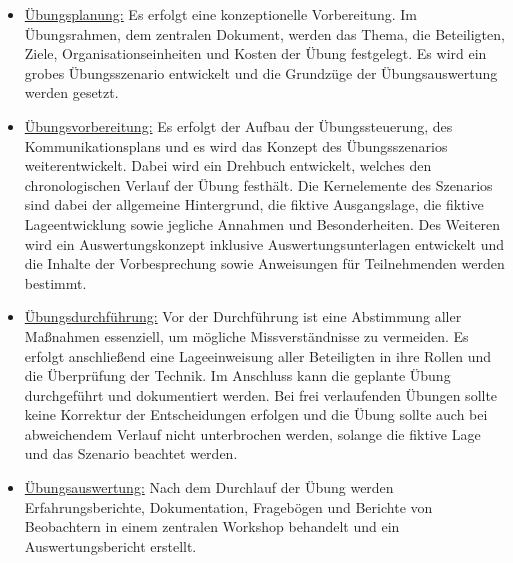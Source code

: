 \begin{itemize}
    \item \underline{Übungsplanung:}
    Es erfolgt eine konzeptionelle Vorbereitung. Im Übungsrahmen, dem zentralen Dokument, werden das Thema, die Beteiligten, Ziele, Organisationseinheiten und Kosten der Übung festgelegt. Es wird ein grobes Übungsszenario entwickelt und die Grundzüge der Übungsauswertung werden gesetzt.  \
    
    \item \underline{Übungsvorbereitung:}
    Es erfolgt der Aufbau der Übungssteuerung, des Kommunikationsplans und es wird das Konzept des Übungsszenarios weiterentwickelt. Dabei wird ein Drehbuch entwickelt, welches den chronologischen Verlauf der Übung festhält. Die Kernelemente des Szenarios sind dabei der allgemeine Hintergrund, die fiktive Ausgangslage, die fiktive Lageentwicklung sowie jegliche Annahmen und Besonderheiten. Des Weiteren wird ein Auswertungskonzept inklusive Auswertungsunterlagen entwickelt und die Inhalte der Vorbesprechung sowie Anweisungen für Teilnehmenden werden bestimmt.\

    \item \underline{Übungsdurchführung:}
    Vor der Durchführung ist eine Abstimmung aller Maßnahmen essenziell, um mögliche Missverständnisse zu vermeiden. Es erfolgt anschließend eine Lageeinweisung aller Beteiligten in ihre Rollen und die Überprüfung der Technik. Im Anschluss kann die geplante Übung durchgeführt und dokumentiert werden. 
    Bei frei verlaufenden Übungen sollte keine Korrektur der Entscheidungen erfolgen und die Übung sollte auch bei abweichendem Verlauf nicht unterbrochen werden, solange die fiktive Lage und das Szenario beachtet werden.
\

    \item \underline{Übungsauswertung:}
    Nach dem Durchlauf der Übung werden Erfahrungsberichte, Dokumentation, Fragebögen und Berichte von Beobachtern in einem zentralen Workshop behandelt und ein Auswertungsbericht erstellt.\\    

\end{itemize} 


